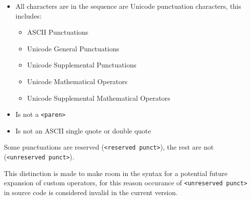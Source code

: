\documentclass[a4paper]{article}
\begin{document}
\begin{itemize}
    \item All characters are in the sequence are Unicode punctuation characters, this includes:
    \begin{itemize}
        \item ASCII Punctuations
        \item Unicode General Punctuations
        \item Unicode Supplemental Punctuations
        \item Unicode Mathematical Operators
        \item Unicode Supplemental Mathematical Operators
    \end{itemize}
    \item Is not a \verb|<paren>|
    \item Is not an ASCII single quote or double quote
\end{itemize}

Some punctuations are reserved (\verb|<reserved punct>|), the rest are not (\verb|<unreserved punct>|).

This distinction is made to make room in the syntax for a potential future expansion of custom operators, for this reason occurance of \verb|<unreserved punct>| in source code is considered invalid in the current version.
\end{document}
